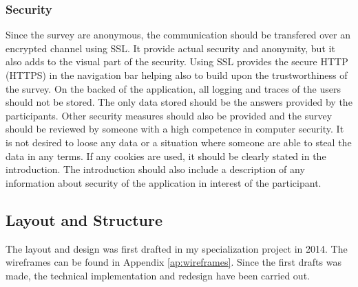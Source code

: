     \subsubsection*{Security}
      Since the survey are anonymous, the communication should be transfered over an encrypted channel using SSL. It provide actual security and anonymity, but it also adds to the visual part of the security. Using SSL provides the secure HTTP (HTTPS) in the navigation bar helping also to build upon the trustworthiness of the survey.
      On the backed of the application, all logging and traces of the users should not be stored. The only data stored should be the answers provided by the participants. 
      Other security measures should also be provided and the survey should be reviewed by someone with a high competence in computer security. It is not desired to loose any data or a situation where someone are able to steal the data in any terms.
      If any cookies are used, it should be clearly stated in the introduction. The introduction should also include a description of any information about security of the application in interest of the participant.


	\subsection{Layout and Structure}

    The layout and design was first drafted in my specialization project in 2014. The wireframes can be found in Appendix \ref{ap:wireframes}. Since the first drafts was made, the technical implementation and redesign have been carried out. 

